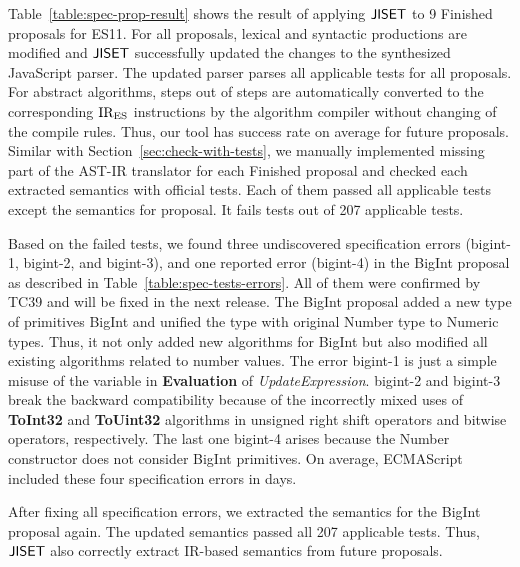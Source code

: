 Table~\ref{table:spec-prop-result} shows the result of applying \( \text{\sf JISET} \) to 9
Finished proposals for ES11.  For all proposals,  lexical and
 syntactic productions are modified and \( \text{\sf JISET} \) successfully
updated the changes to the synthesized JavaScript parser.  The updated parser
parses all applicable tests for all proposals.  For abstract algorithms,
 steps out of  steps are automatically converted to the
corresponding \( \text{IR}_\text{ES} \) instructions by the algorithm compiler without
changing of the compile rules.  Thus, our tool has  success rate
on average for future proposals.  Similar with
Section~\ref{sec:check-with-tests}, we manually implemented missing part of the
AST-IR translator for each Finished proposal and checked each extracted
semantics with official tests.  Each of them passed all applicable tests except
the semantics for  proposal.  It fails  tests out of 207
applicable tests.

Based on the failed tests, we found three undiscovered specification errors
(bigint-1, bigint-2, and bigint-3), and one reported error (bigint-4) in the
BigInt proposal as described in Table~\ref{table:spec-tests-errors}.  All of
them were confirmed by TC39 and will be fixed in the next release.  The BigInt
proposal added a new type of primitives BigInt and unified the type with
original Number type to Numeric types.  Thus, it not only added new
algorithms for BigInt but also modified all existing algorithms related to
number values.  The error bigint-1 is just a simple misuse of the variable
 in {\bf Evaluation} of {\it UpdateExpression}. bigint-2 and
bigint-3 break the backward compatibility because of the incorrectly mixed uses
of {\bf ToInt32} and {\bf ToUint32} algorithms in unsigned right shift operators
and bitwise operators, respectively. The last one bigint-4 arises because the
Number constructor does not consider BigInt primitives.  On average, ECMAScript
included these four specification errors in  days.

After fixing all specification errors, we extracted the semantics for the BigInt
proposal again.  The updated semantics passed all 207 applicable tests.  Thus,
\( \text{\sf JISET} \) also correctly extract IR-based semantics from future proposals.
